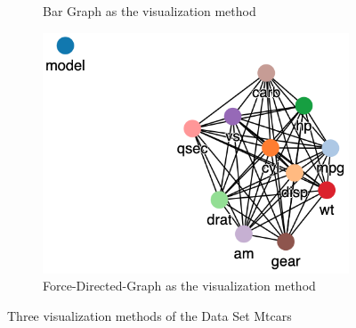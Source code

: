 \begin{figure}[h]
\begin{subfigure}[b]{0.32\textwidth}
		\caption{Bar Graph as the visualization method}
		\label{fig:Bar Graph}
	\end{subfigure}
	\hfill
	\begin{subfigure}[b]{0.32\textwidth}
		\centering
		\includegraphics[width=\textwidth]{pictures/fdg}
		\caption{Force-Directed-Graph as the visualization method}
		\label{fig:Force-Directed-Graph}
	\end{subfigure}
	\caption{Three visualization methods of the Data Set Mtcars}
	\label{fig:vis}
\end{figure}
